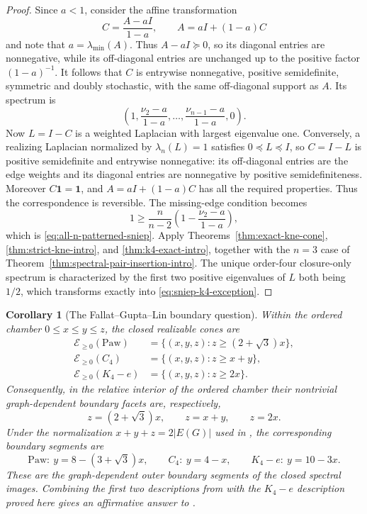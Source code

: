 \documentclass[11pt,reqno]{amsart}
\newtheorem{corollary}[theorem]{Corollary}
\theoremstyle{definition}
\theoremstyle{remark}
\newcommand{\one}{\mathbf 1}
\begin{document}
\begin{proof}
Since $a<1$, consider the affine transformation
\[
  C=\frac{A-aI}{1-a},
  \qquad A=aI+(1-a)C
\]
and note that $a=\lambda_{\min}(A)$.  Thus $A-aI\succeq0$, so its diagonal
entries are nonnegative, while its off-diagonal entries are unchanged up to
the positive factor $(1-a)^{-1}$.  It follows that $C$ is entrywise
nonnegative, positive semidefinite, symmetric and doubly stochastic, with the
same off-diagonal support as $A$.  Its spectrum is
\[
  \left(1,\frac{\nu_2-a}{1-a},\ldots,
             \frac{\nu_{n-1}-a}{1-a},0\right).
\]
Now $L=I-C$ is a weighted Laplacian with largest eigenvalue one.  Conversely,
a realizing Laplacian normalized by $\lambda_n(L)=1$ satisfies
$0\preceq L\preceq I$, so $C=I-L$ is positive semidefinite and entrywise
nonnegative: its off-diagonal entries are the edge weights and its diagonal
entries are nonnegative by positive semidefiniteness.  Moreover
$C\one=\one$, and $A=aI+(1-a)C$ has all the required properties.  Thus the
correspondence is reversible.  The missing-edge condition becomes
\[
  1\ge\frac{n}{n-2}
  \left(1-\frac{\nu_2-a}{1-a}\right),
\]
which is \eqref{eq:all-n-patterned-sniep}.  Apply
Theorems~\ref{thm:exact-kne-cone}, \ref{thm:strict-kne-intro}, and
\ref{thm:k4-exact-intro}, together with the $n=3$ case of
Theorem~\ref{thm:spectral-pair-insertion-intro}.  The unique order-four
closure-only spectrum is characterized by the first two positive eigenvalues
of $L$ both being $1/2$, which transforms exactly into
\eqref{eq:sniep-k4-exception}.
\end{proof}

\begin{corollary}[The Fallat--Gupta--Lin boundary question]
\label{cor:fgl-boundaries}
Within the ordered chamber $0\le x\le y\le z$, the closed realizable cones
are
\begin{align*}
  \mathcal E_{\ge0}(\mathrm{Paw})
    &=\{(x,y,z):z\ge(2+\sqrt3)x\},\\
  \mathcal E_{\ge0}(C_4)
    &=\{(x,y,z):z\ge x+y\},\\
  \mathcal E_{\ge0}(K_4-e)
    &=\{(x,y,z):z\ge2x\}.
\end{align*}
Consequently, in the relative interior of the ordered chamber their
nontrivial graph-dependent boundary facets are, respectively,
\[
  z=(2+\sqrt3)x,\qquad z=x+y,\qquad z=2x.
\]
Under the normalization $x+y+z=2|E(G)|$ used in \cite{FGL2025}, the
corresponding boundary segments are
\[
 \mathrm{Paw}:\ y=8-(3+\sqrt3)x,
 \qquad C_4:\ y=4-x,
 \qquad K_4-e:\ y=10-3x.
\]
These are the graph-dependent outer boundary segments of the closed spectral
images.  Combining the first two descriptions from \cite{EJT2026} with the
$K_4-e$ description proved here gives an affirmative answer to
\cite[Section~5, item~1]{FGL2025}.
\end{corollary}
\end{document}
